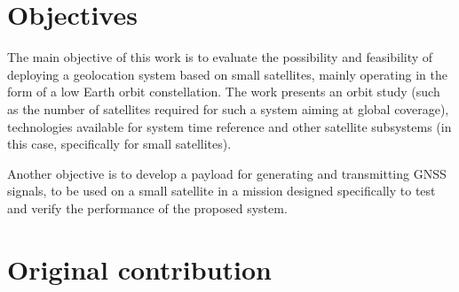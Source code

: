 \section{Objectives}



The main objective of this work is to evaluate the possibility and feasibility of deploying a geolocation system based on small satellites, mainly operating in the form of a low Earth orbit constellation. The work presents an orbit study (such as the number of satellites required for such a system aiming at global coverage), technologies available for system time reference and other satellite subsystems (in this case, specifically for small satellites).

Another objective is to develop a payload for generating and transmitting GNSS signals, to be used on a small satellite in a mission designed specifically to test and verify the performance of the proposed system.

\section{Original contribution}



